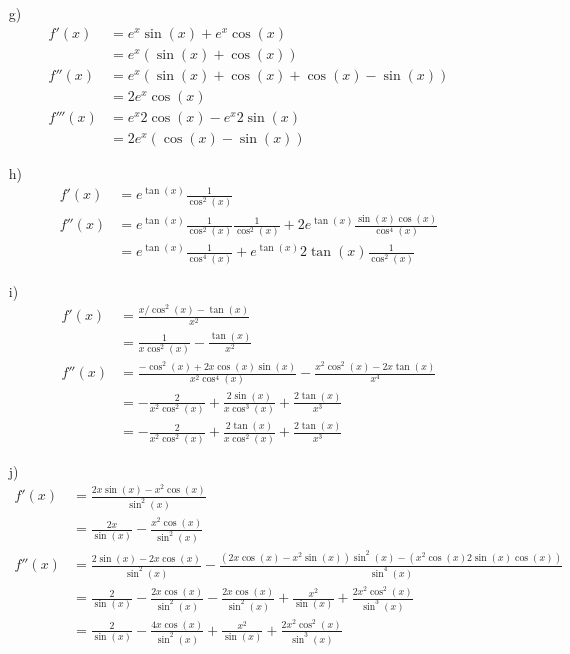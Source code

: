 {\begin{itemize}
\begin{align*}
f'''(x) &= 6 \cos^3(x) -6 \sin(x) 2 \cos(x)\sin(x)-9 \sin^2(x)\cos(x) \\
        &= 6 \cos^3(x) -21 \sin^2(x) \cos(x)             
\end{align*}
\item[g)]
\begin{align*}
f'(x) &= e^x \sin(x) + e^x \cos(x) \\
      &= e^x (\sin(x)+\cos(x)) \\
f''(x) &= e^x ( \sin(x) +\cos(x) +\cos(x) -\sin(x)) \\
       &= 2 e^x \cos(x) \\
f'''(x) &= e^x 2 \cos(x) - e^x 2 \sin(x) \\
        &= 2 e^x (\cos(x)-\sin(x))             
\end{align*}
\item[h)]
\begin{align*}
f'(x) &=   e^{\tan(x)} \frac{1}{\cos^2(x)}\\
f''(x) &=    e^{\tan(x)} \frac{1}{\cos^2(x)} \frac{1}{\cos^2(x)} + 2 e^{\tan(x)}  \frac{\sin(x) \cos(x)}{\cos^4(x)} \\
       &= e^{\tan(x)} \frac{1}{\cos^4(x)} + e^{\tan(x)} 2 \tan(x)  \frac{1}{\cos^2(x)}
\end{align*}
\item[i)]
\begin{align*}
f'(x) &= \frac{x/\cos^2(x) -\tan(x) }{x^2} \\
      &= \frac{1}{x \cos^2(x)} -\frac{\tan(x)}{x^2} \\
f''(x) &= \frac{-\cos^2(x)+2x\cos(x)\sin(x)}{x^2\cos^4(x)}- \frac{x^2\cos^2(x)-2x\tan(x)}{x^4} \\
       &= - \frac{2}{x^2 \cos^2(x)} +\frac{2 \sin(x)}{x \cos^3(x)} + \frac{2 \tan(x)}{x^3} \\
       &=   - \frac{2}{x^2 \cos^2(x)} +\frac{2 \tan(x)}{x \cos^2(x)} + \frac{2 \tan(x)}{x^3}    
\end{align*}
\item[j)]
\begin{align*}
f'(x) &=   \frac{2x \sin(x)-x^2\cos(x)}{\sin^2(x)}\\
      &= \frac{2x}{\sin(x)} - \frac{x^2 \cos(x)}{\sin^2(x)} \\
f''(x) &= \frac{2\sin(x)-2x\cos(x)}{\sin^2(x)} - \frac{(2x\cos(x)-x^2\sin(x))\sin^2(x)-(x^2 \cos(x)2\sin(x)\cos(x))}{\sin^4(x)}\\
       &= \frac{2}{\sin(x)} - \frac{2x\cos(x)}{\sin^2(x)} - \frac{2x\cos(x)}{\sin^2(x)}  + \frac{x^2}{\sin(x)} + \frac{2x^2\cos^2(x)}{\sin^3(x)} \\
       &=  \frac{2}{\sin(x)} - \frac{4x\cos(x)}{\sin^2(x)}+ \frac{x^2}{\sin(x)} + \frac{2x^2\cos^2(x)}{\sin^3(x)}
\end{align*}
\end{itemize}



}

